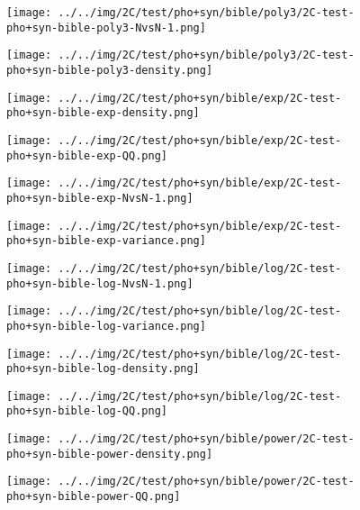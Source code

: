 \begin{figure}[H]
\centering	\texttt{[image: ../../img/2C/test/pho+syn/bible/poly3/2C-test-pho+syn-bible-poly3-NvsN-1.png]}
\end{figure}
\begin{figure}[H]
\centering	\texttt{[image: ../../img/2C/test/pho+syn/bible/poly3/2C-test-pho+syn-bible-poly3-density.png]}
\end{figure}
\begin{figure}[H]
\centering	\texttt{[image: ../../img/2C/test/pho+syn/bible/exp/2C-test-pho+syn-bible-exp-density.png]}
\end{figure}
\begin{figure}[H]
\centering	\texttt{[image: ../../img/2C/test/pho+syn/bible/exp/2C-test-pho+syn-bible-exp-QQ.png]}
\end{figure}
\begin{figure}[H]
\centering	\texttt{[image: ../../img/2C/test/pho+syn/bible/exp/2C-test-pho+syn-bible-exp-NvsN-1.png]}
\end{figure}
\begin{figure}[H]
\centering	\texttt{[image: ../../img/2C/test/pho+syn/bible/exp/2C-test-pho+syn-bible-exp-variance.png]}
\end{figure}
\begin{figure}[H]
\centering	\texttt{[image: ../../img/2C/test/pho+syn/bible/log/2C-test-pho+syn-bible-log-NvsN-1.png]}
\end{figure}
\begin{figure}[H]
\centering	\texttt{[image: ../../img/2C/test/pho+syn/bible/log/2C-test-pho+syn-bible-log-variance.png]}
\end{figure}
\begin{figure}[H]
\centering	\texttt{[image: ../../img/2C/test/pho+syn/bible/log/2C-test-pho+syn-bible-log-density.png]}
\end{figure}
\begin{figure}[H]
\centering	\texttt{[image: ../../img/2C/test/pho+syn/bible/log/2C-test-pho+syn-bible-log-QQ.png]}
\end{figure}
\begin{figure}[H]
\centering	\texttt{[image: ../../img/2C/test/pho+syn/bible/power/2C-test-pho+syn-bible-power-density.png]}
\end{figure}
\begin{figure}[H]
\centering	\texttt{[image: ../../img/2C/test/pho+syn/bible/power/2C-test-pho+syn-bible-power-QQ.png]}
\end{figure}
